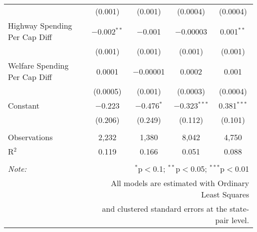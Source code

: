 \begin{table}[!htbp]
\begin{tabular}{@{\extracolsep{5pt}}lcccc}
  & (0.001) & (0.001) & (0.0004) & (0.0004) \\ 
  Highway Spending Per Cap Diff & $-$0.002$^{**}$ & $-$0.001 & $-$0.00003 & 0.001$^{**}$ \\ 
  & (0.001) & (0.001) & (0.001) & (0.001) \\ 
  Welfare Spending Per Cap Diff & 0.0001 & $-$0.00001 & 0.0002 & 0.001 \\ 
  & (0.0005) & (0.001) & (0.0003) & (0.0004) \\ 
  Constant & $-$0.223 & $-$0.476$^{*}$ & $-$0.323$^{***}$ & 0.381$^{***}$ \\ 
  & (0.206) & (0.249) & (0.112) & (0.101) \\ 
 \hline \\[-1.8ex] 
Observations & 2,232 & 1,380 & 8,042 & 4,750 \\ 
R$^{2}$ & 0.119 & 0.166 & 0.051 & 0.088 \\ 
\hline 
\hline \\[-1.8ex] 
\textit{Note:}  & \multicolumn{4}{r}{$^{*}$p$<$0.1; $^{**}$p$<$0.05; $^{***}$p$<$0.01} \\ 
 & \multicolumn{4}{r}{All models are estimated with Ordinary Least Squares} \\ 
 & \multicolumn{4}{r}{and clustered standard errors at the state-pair level.} \\ 
\end{tabular} 
\end{table} 
